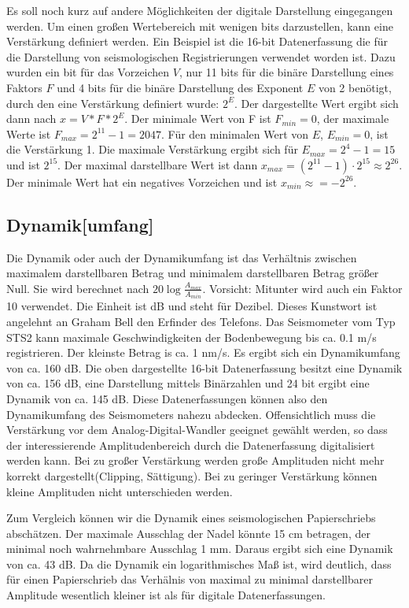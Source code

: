 Es soll noch kurz auf andere Möglichkeiten der digitale Darstellung eingegangen werden. Um einen großen Wertebereich mit wenigen bits darzustellen, kann eine Verstärkung definiert werden. Ein Beispiel ist die 16-bit Datenerfassung die für die Darstellung von seismologischen Registrierungen verwendet worden ist. Dazu wurden ein bit für das Vorzeichen $V$, nur 11 bits für die binäre Darstellung eines Faktors $F$  und 4 bits für die binäre Darstellung des Exponent $E$ von 2 benötigt, durch den eine Verstärkung definiert wurde: $2^{E}$. Der dargestellte Wert ergibt sich dann nach $x = V*F*2^E$. Der minimale Wert von F ist  $F_{min}=0$, der maximale Werte ist $F_{max}=2^{11}-1 = 2047$. Für den minimalen Wert von $E$, $E_{min}=0$, ist die Verstärkung 1. Die maximale Verstärkung ergibt sich für $E_{max}=2^{4}-1=15$ und ist $2^{15}$. Der maximal darstellbare Wert ist dann  $x_{max}=(2^{11}-1) \cdot 2^{15} \approx 2^{26}$. Der minimale Wert hat ein negatives Vorzeichen und ist $x_{min} \approx = -2^{26}$. 

\subsection{Dynamik[umfang]}
Die Dynamik oder auch der Dynamikumfang ist das Verhältnis zwischen maximalem darstellbaren Betrag und minimalem darstellbaren Betrag größer Null. Sie wird berechnet nach  $20\log \frac{A_{max}}{A_{min}}$. Vorsicht: Mitunter wird auch ein Faktor 10 verwendet. Die  Einheit ist dB und steht für Dezibel. Dieses Kunstwort ist angelehnt an Graham Bell den Erfinder des Telefons.  Das Seismometer vom Typ STS2 kann maximale Geschwindigkeiten der Bodenbewegung bis ca. 0.1 m/s registrieren. Der kleinste Betrag is ca. 1 nm/s. Es ergibt sich ein Dynamikumfang von ca. 160 dB. Die oben dargestellte 16-bit Datenerfassung besitzt eine Dynamik von ca. 156 dB, eine Darstellung mittels Binärzahlen und 24 bit ergibt eine Dynamik von ca. 145 dB. Diese Datenerfassungen können also den Dynamikumfang des Seismometers nahezu abdecken. Offensichtlich muss die Verstärkung vor dem Analog-Digital-Wandler geeignet gewählt werden, so dass der interessierende Amplitudenbereich durch die Datenerfassung digitalisiert werden kann. Bei zu großer Verstärkung werden große Amplituden nicht mehr korrekt dargestellt(Clipping, Sättigung).  Bei zu geringer Verstärkung können kleine Amplituden nicht unterschieden werden. 

Zum Vergleich können wir die Dynamik eines seismologischen Papierschriebs abschätzen. Der maximale Ausschlag der Nadel könnte 15 cm betragen, der minimal noch wahrnehmbare Ausschlag 1 mm. Daraus ergibt sich eine Dynamik von ca. 43 dB. Da die Dynamik ein logarithmisches Maß ist, wird deutlich, dass für einen Papierschrieb das Verhälnis von maximal zu minimal darstellbarer Amplitude wesentlich kleiner ist als für digitale Datenerfassungen. 
 

